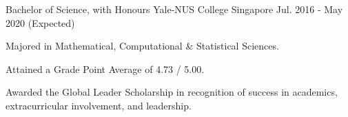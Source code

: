 

\begin{cventries}

  \cventry
    {Bachelor of Science, with Honours} %
    {Yale-NUS College} %
    {Singapore} %
    {Jul. 2016 - May 2020 (Expected)} %
    {
      \begin{cvitems} %
      \item {Majored in Mathematical, Computational \& Statistical Sciences.}
      \item {Attained a Grade Point Average of 4.73 / 5.00.}
      \item {Awarded the Global Leader Scholarship in recognition of success in
          academics, extracurricular involvement, and leadership.}
      \end{cvitems}
    }

\end{cventries}

